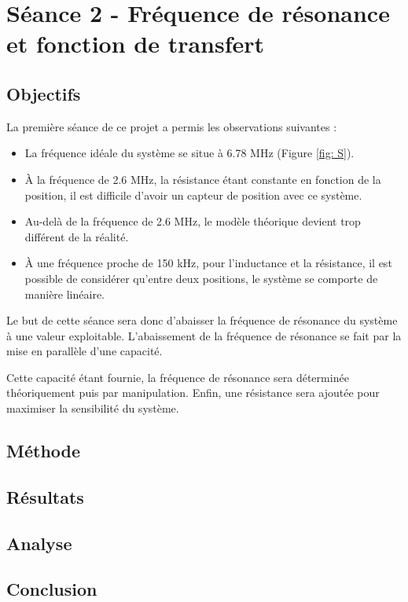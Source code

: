 

\section{Séance 2 - Fréquence de résonance et fonction de transfert}


\subsection{Objectifs}
La première séance de ce projet a permis les observations suivantes :
\begin{itemize}
    \item La fréquence idéale du système se situe à 6.78 MHz (Figure \ref{fig: S}).
    \item À la fréquence de 2.6 MHz, la résistance étant constante en fonction de la position,
    il est difficile d'avoir un capteur de position avec ce système.
    \item Au-delà de la fréquence de 2.6 MHz, le modèle théorique devient trop différent de la réalité.
    \item À une fréquence proche de 150 kHz, pour l'inductance et la résistance, il est possible
    de considérer qu'entre deux positions, le système se comporte de manière linéaire.  
\end{itemize}

\vspace{0,2cm}

Le but de cette séance sera donc d'abaisser la fréquence de résonance du système à une valeur
exploitable. L'abaissement de la fréquence de résonance se fait par la mise en parallèle d'une 
capacité.
\vspace{0,2cm}

Cette capacité étant fournie, la fréquence de résonance sera déterminée théoriquement puis par
manipulation. Enfin, une résistance sera ajoutée pour maximiser la sensibilité du système. 


\subsection{Méthode}


\subsection{Résultats}

\subsection{Analyse}

\subsection{Conclusion}
